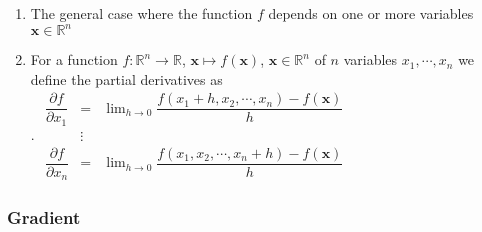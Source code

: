 \begin{enumerate}
    \item 
    \begin{definition}
        The general case where the function $f$ depends on one or more variables $\bm{x} \in \mathbb{R}^n$
        \hfill \cite{mfml/book/mml/Deisenroth-Faisal-Ong}
    \end{definition}

    \item 
    \begin{definition}
        For a function $f : \mathbb{R}^n \to \mathbb{R}$, $\bm{x} \mapsto f (\bm{x})$, $\bm{x} \in \mathbb{R}^n$ of $n$ variables $x_1, \cdots , x_n$ we define the partial derivatives as
        \hfill \cite{mfml/book/mml/Deisenroth-Faisal-Ong}
        \\
        .\hfill
        ${
            \displaystyle
            \begin{matrix}
                \dfrac{\partial f}{\partial x_1} 
                & 
                = 
                & 
                \lim_{h\to 0} \dfrac{f (x_1 + h, x_2, \cdots , x_n) - f (\bm{x})}{h}
                \\
                & \vdots &
                \\
                \dfrac{\partial f}{\partial x_n} 
                & 
                = 
                & 
                \lim_{h\to 0} \dfrac{f (x_1 , x_2, \cdots , x_n+ h) - f (\bm{x})}{h}
            \end{matrix}
        }$
        \hfill \cite{mfml/book/mml/Deisenroth-Faisal-Ong}
    \end{definition}
\end{enumerate}

\subsubsection{Gradient}

